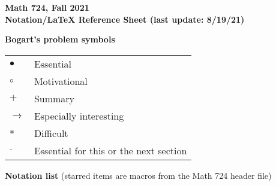 \documentclass{amsart}
\begin{document}
\bf Math 724, Fall 2021\\
Notation/LaTeX Reference Sheet \rm (last update: 8/19/21)

{\bf Bogart's problem symbols}

\begin{tabular}{ll}
$\bullet$ & Essential\\
$\circ$ & Motivational\\
$+$ & Summary\\
$\to$ & Especially interesting\\
* & Difficult\\
$\cdot$ & Essential for this or the next section
\end{tabular}

{\bf Notation list} (starred items are macros from the Math 724 header file)
\end{document}

